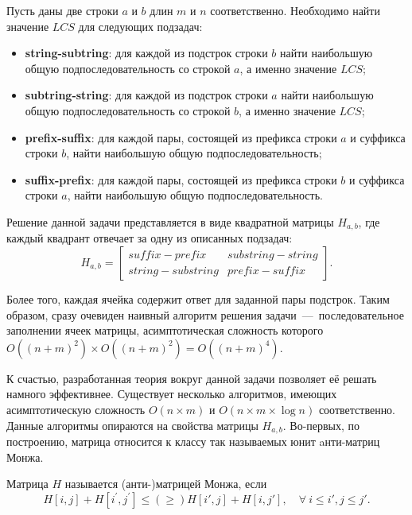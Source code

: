 \begin{definition}
Пусть даны две строки $a$ и $b$ длин $m$ и $n$ соответственно. 
Необходимо найти значение $LCS$ для следующих подзадач:
\begin{itemize}
\item \textbf{string-subtring}: для каждой из подстрок строки $b$ найти наибольшую общую подпоследовательность со строкой $a$, а именно значение $LCS$;
\item \textbf{subtring-string}: для каждой из подстрок строки $a$ найти наибольшую общую подпоследовательность со строкой $b$, а именно значение $LCS$;
\item \textbf{prefix-suffix}: для каждой пары, состоящей из префикса строки $a$ и суффикса строки $b$, найти наибольшую общую подпоследовательность;
\item \textbf{suffix-prefix}: для каждой пары, состоящей из префикса строки $b$ и суффикса строки $a$, найти наибольшую общую подпоследовательность.
\end{itemize}
\end{definition}

Решение данной задачи представляется в виде квадратной матрицы $H_{a,b}$, где каждый квадрант отвечает за одну из описанных подзадач: 
\begin{equation}
H_{a,b} = \begin{bmatrix}
  suffix-prefix & substring-string \\
  string-substring & prefix-suffix
  \end{bmatrix}.
\end{equation}

Более того, каждая ячейка содержит ответ для заданной пары подстрок.
Таким образом, сразу очевиден наивный алгоритм решения задачи~---~последовательное заполнении ячеек матрицы, асимптотическая сложность которого $O((n+m)^2) \times O((n+m)^2) = O((n+ m)^4)$.

К счастью, разработанная теория вокруг данной задачи позволяет её решать намного эффективнее.
Существует несколько алгоритмов, имеющих асимптотическую сложность $O(n \times m)$ и $O(n \times m \times \log n)$ соответственно.
Данные алгоритмы опираются на свойства матрицы $H_{a,b}$. %
Во-первых, по построению, матрица относится к классу так называемых юнит aнти-матриц Монжа.
\begin{definition}
Матрица $H$ называется (анти-)матрицей Монжа, если %
\begin{equation}
  H[i, j] + H[i^{'},j^{'}] \leq(\geq) H[i', j] + H[i,j'] ,\quad \forall \: i \leq i' , j \leq j'.
\end{equation}
\end{definition}

